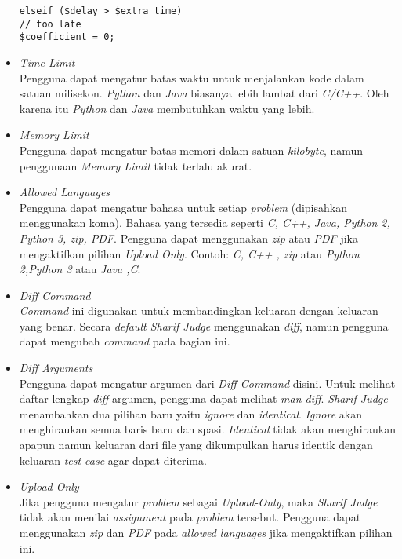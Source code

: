 \begin{itemize}
\begin{lstlisting}[basicstyle=\ttfamily, frame=single,
columns=fullflexible, keepspaces=true, breaklines=true]
elseif ($delay > $extra_time)
// too late
$coefficient = 0;
\end{lstlisting}
	
	\item \textit{Time Limit} \\
	Pengguna dapat mengatur batas waktu untuk menjalankan kode dalam satuan milisekon. \textit{Python} dan \textit{Java} biasanya lebih lambat dari \textit{C/C++}.	Oleh karena itu \textit{Python} dan \textit{Java} membutuhkan waktu yang lebih.
	
	\item \textit{Memory Limit} \\
	Pengguna dapat mengatur batas memori dalam satuan \textit{kilobyte}, namun penggunaan \textit{Memory Limit} tidak terlalu akurat.
	
	\item \textit{Allowed Languages} \\
	Pengguna dapat mengatur bahasa untuk setiap \textit{problem} (dipisahkan menggunakan koma). Bahasa yang tersedia seperti \textit{C, C++, Java, Python 2, Python 3, zip, PDF}. Pengguna dapat menggunakan \textit{zip} atau \textit{PDF} jika mengaktifkan pilihan \textit{Upload Only}. Contoh: \textit{C, C++ , zip} atau \textit{Python 2,Python 3} atau \textit{Java ,C}.
	
	\item \textit{Diff Command} \\
	\textit{Command} ini digunakan untuk membandingkan keluaran dengan keluaran yang benar. Secara \textit{default Sharif Judge} menggunakan \textit{diff}, namun pengguna dapat mengubah \textit{command} pada bagian ini.
	
	\item \textit{Diff Arguments} \\
	Pengguna dapat mengatur argumen dari \textit{Diff Command} disini. Untuk melihat daftar lengkap \textit{diff} argumen, pengguna dapat melihat \textit{man diff}. \textit{Sharif Judge} menambahkan dua pilihan baru yaitu \textit{ignore} dan \textit{identical}. \textit{Ignore} akan menghiraukan semua baris baru dan spasi. \textit{Identical} tidak akan menghiraukan apapun namun keluaran dari file yang dikumpulkan harus identik dengan keluaran \textit{test case} agar dapat diterima.
	
	\item \textit{Upload Only} \\
	Jika pengguna mengatur \textit{problem} sebagai \textit{Upload-Only}, maka \textit{Sharif Judge} tidak akan menilai \textit{assignment} pada \textit{problem} tersebut. Pengguna dapat menggunakan \textit{zip} dan \textit{PDF} pada \textit{allowed languages} jika mengaktifkan pilihan ini.
\end{itemize}

